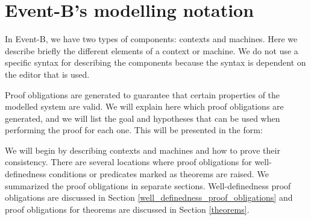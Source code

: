 \newcommand{\varlist}[1]{\mathbf{#1}}
\newcommand{\allconstants}{\varlist{c}}
\newcommand{\absvariables}{\varlist{v}}
\newcommand{\concvariables}{\varlist{w}}
\newcommand{\allvariables}{{\absvariables,\concvariables}}
\newcommand{\absparameters}{\varlist{t}}
\newcommand{\concparameters}{\varlist{u}}
\newcommand{\allparameters}{{\absparameters,\concparameters}}
\newcommand{\absbeforeafter}{\mathcal{S}}
\newcommand{\concbeforeafter}{\mathcal{T}}


\clearpage

\section{Event-B's modelling notation}
\label{modeling_notation}

In Event-B, we have two types of components: contexts and machines.
Here we describe briefly the different elements of a context or machine.
We do not use a specific syntax for describing the components because the syntax is dependent on the editor that is
used. 

Proof obligations are generated to guarantee that certain properties of the modelled system are valid.
We will explain here which proof obligations are generated, and we will list the goal and hypotheses that can be used
when performing the proof for each one.
This will be presented in the form:

We will begin by describing contexts and machines and how to prove their consistency.
There are several locations where proof obligations for well-definedness conditions
 or predicates marked as theorems are raised.
We summarized the proof obligations in separate sections. Well-definedness proof obligations are discussed in Section \ref{well_definedness_proof_obligations}
and proof obligations for theorems are discussed in Section \ref{theorems}.


